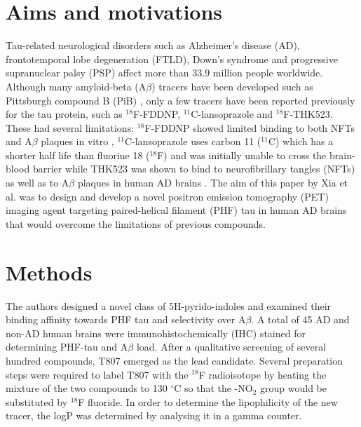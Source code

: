 \documentclass[11pt,a4paper,oneside]{report}
\begin{document}




\section*{Aims and motivations}

Tau-related neurological disorders such as Alzheimer's disease (AD), frontotemporal lobe degeneration (FTLD), Down's syndrome and progressive supranuclear palsy (PSP) affect more than 33.9 million people worldwide. \cite{barnes2011projected} Although many amyloid-beta (A$\beta$) tracers have been developed such as Pittsburgh compound B (PiB) \cite{klunk2004imaging}, only a few tracers have been reported previously for the tau protein, such as $^{18}$F-FDDNP\cite{barrio1999pet}, $^{11}$C-lansoprazole\cite{rojo2010selective} and $^{18}$F-THK523\cite{fodero201118f}. These had several limitations: $^{18}$F-FDDNP showed limited binding to both NFTs and A$\beta$ plaques in vitro \cite{thompson2009interaction}, $^{11}$C-lansoprazole uses carbon 11 ($^{11}$C) which has a shorter half life than fluorine 18 ($^{18}$F) and was initially unable to cross the brain-blood barrier \cite{shao2012evaluation} while THK523 was shown to bind to neurofibrillary tangles (NFTs) as well as to A$\beta$ plaques in human AD brains \cite{zeng20128invitro}. The aim of this paper by Xia et al. \cite{xia201318} was to design and develop a novel positron emission tomography (PET) imaging agent targeting paired-helical filament (PHF) tau in human AD brains that would overcome the limitations of previous compounds.

\section*{Methods}

The authors designed a novel class of 5H-pyrido-indoles and examined their binding affinity towards PHF tau and selectivity over A$\beta$. A total of 45 AD and non-AD human brains were immunohistochemically (IHC) stained for determining PHF-tau and A$\beta$ load. After a qualitative screening of several hundred compounds, T807 emerged as the lead candidate. Several preparation steps were required to label T807 with the $^{18}$F radioisotope by heating the mixture of the two compounds to 130 $^{\circ}$C so that the -NO$_2$ group would be substituted by $^{18}$F fluoride. In order to determine the lipophilicity of the new tracer, the logP was determined by analysing it in a gamma counter. 
\end{document}
